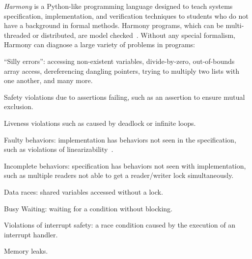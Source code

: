 \documentclass[twocolumn]{article}
\begin{document}
\emph{Harmony} is a Python-like programming language designed to teach
systems specification, implementation, and verification techniques to
students who do not have a background in formal methods.
Harmony programs, which can be multi-threaded
or distributed, are model checked~\cite{CES86}.
Without any special formalism, Harmony can diagnose a large variety
of problems in programs:
\begin{compactitem}
\item ``Silly errors'': accessing non-existent variables,
divide-by-zero, out-of-bounds array access, dereferencing dangling
pointers, trying to multiply two lists with one another,
and many more.
\item Safety violations due to assertions failing, such as an assertion to ensure mutual exclusion.
\item Liveness violations such as caused by deadlock or infinite loops.
\item Faulty behaviors: implementation has behaviors not seen in the specification, such as violations of linearizability~\cite{HW90}.
\item Incomplete behaviors: specification has behaviors not seen with implementation, such as multiple readers not able to get a reader/writer lock simultaneously.
\item Data races: shared variables accessed without a lock.
\item Busy Waiting: waiting for a condition without blocking.
\item Violations of interrupt safety: a race condition caused by the execution
of an interrupt handler.
\item Memory leaks.
\end{compactitem}
\end{document}
